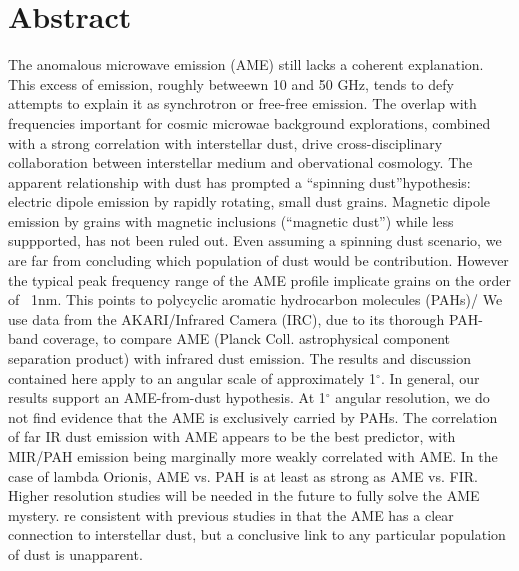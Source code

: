 \chapter*{Abstract}
The anomalous microwave emission (AME) still lacks a coherent explanation.  This excess of emission, roughly betweewn 10 and 50 GHz, tends to defy attempts to explain it as synchrotron or free-free emission. The overlap with frequencies important for cosmic microwae background explorations, combined with a strong correlation with interstellar dust, drive cross-disciplinary collaboration between interstellar medium and obervational cosmology. The apparent relationship with dust has prompted a ``spinning dust''hypothesis:  electric dipole emission by rapidly rotating, small dust grains. Magnetic dipole emission by grains with magnetic inclusions (``magnetic dust'') while less suppported, has not been ruled out. Even assuming a spinning dust scenario, we are far from concluding which population of dust would be contribution. However the typical peak frequency range of the AME profile implicate grains on the order of ~1nm. This points to polycyclic aromatic hydrocarbon molecules (PAHs)/ We use data from the AKARI/Infrared Camera (IRC), due to its thorough PAH-band coverage, to compare AME (Planck Coll. astrophysical component separation product) with infrared dust emission. The results and discussion contained here apply to an angular scale of approximately 1$^{\circ}$. In general, our results support an AME-from-dust hypothesis. At 1$^{\circ}$ angular resolution, we do not find evidence that the AME is exclusively carried by PAHs. The correlation of far IR dust emission with AME appears to be the best predictor, with MIR/PAH emission being marginally more weakly correlated with AME. In the case of lambda Orionis, AME vs. PAH is at least as strong as AME vs. FIR. Higher resolution studies will be needed in the future to fully solve the AME mystery. re consistent with previous studies in that the AME has a clear connection to interstellar dust, but a conclusive link to any particular population of dust is unapparent.
